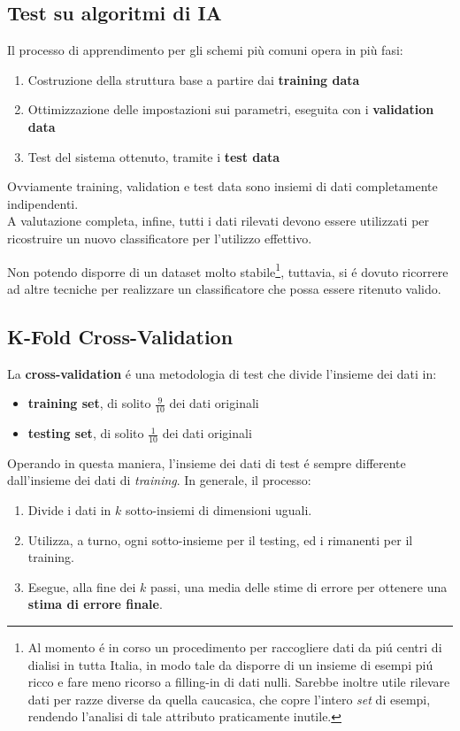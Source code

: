 \documentclass[preprint]{acm_proc_article-sp}
\begin{document}
\subsection{Test su algoritmi di IA}
Il processo di apprendimento per gli schemi più comuni opera in più fasi:
\begin{enumerate}
\item Costruzione della struttura base a partire dai \textbf{training data}
\item Ottimizzazione delle impostazioni sui parametri, eseguita con i \textbf{validation data}
\item Test del sistema ottenuto, tramite i \textbf{test data}
\end{enumerate}
Ovviamente training, validation e test data sono insiemi di dati completamente indipendenti.\\
A valutazione completa, infine, tutti i dati rilevati devono essere utilizzati per ricostruire un nuovo classificatore per l'utilizzo effettivo.

Non potendo disporre di un dataset molto stabile\footnote{Al momento \'e in corso un procedimento per raccogliere dati da pi\'u centri di dialisi in tutta Italia, in modo tale da disporre di un insieme di esempi pi\'u ricco e fare meno ricorso a filling-in di dati nulli. Sarebbe inoltre utile rilevare dati per razze diverse da quella caucasica, che copre l'intero \textit{set} di esempi, rendendo l'analisi di tale attributo praticamente inutile.}, tuttavia, si \'e dovuto ricorrere ad altre tecniche per realizzare un classificatore che possa essere ritenuto valido.

\subsection{K-Fold Cross-Validation}
\label{k-fold}
La \textbf{cross-validation} \'e una metodologia di test che divide l'insieme dei dati in:
\begin{itemize}
\item \textbf{training set}, di solito $\frac{9}{10}$ dei dati originali
\item \textbf{testing set}, di solito $\frac{1}{10}$ dei dati originali
\end{itemize}

Operando in questa maniera, l'insieme dei dati di test \'e sempre differente dall'insieme dei dati di \textit{training}. In generale, il processo:
\begin{enumerate}
\item Divide i dati in $k$ sotto-insiemi di dimensioni uguali.
\item Utilizza, a turno, ogni sotto-insieme per il testing, ed i rimanenti per il training.
\item Esegue, alla fine dei $k$ passi, una media delle stime di errore per ottenere una \textbf{stima di errore finale}.
\end{enumerate}
\end{document}
